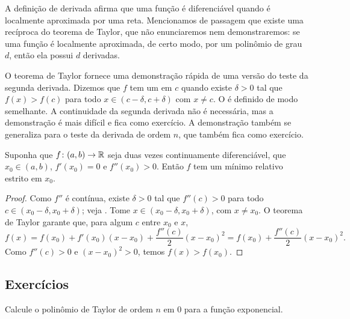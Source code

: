 \medskip

A definição de derivada afirma que uma função é diferenciável quando é localmente aproximada por uma reta. Mencionamos de passagem que existe uma recíproca do teorema de Taylor, que não enunciaremos nem demonstraremos: se uma função é localmente aproximada, de certo modo, por um polinômio de grau $d$, então ela possui $d$ derivadas.

\medskip

O teorema de Taylor fornece uma demonstração rápida de uma versão do teste da segunda derivada. Dizemos que $f$ tem um \emph{} em $c$ quando existe $\delta>0$ tal que $f(x)>f(c)$ para todo $x \in (c-\delta,c+\delta)$ com $x\neq c$. O \emph{} é definido de modo semelhante. A continuidade da segunda derivada não é necessária, mas a demonstração é mais difícil e fica como exercício. A demonstração também se generaliza para o teste da derivada de ordem $n$, que também fica como exercício.

\begin{prop}
Suponha que $f \colon (a,b) \to {\mathbb{R}}$ seja duas vezes continuamente diferenciável, que $x_0 \in (a,b)$, $f'(x_0)=0$ e $f''(x_0)>0$. Então $f$ tem um mínimo relativo estrito em $x_0$.
\end{prop}

\begin{proof}
Como $f''$ é contínua, existe $\delta>0$ tal que $f''(c)>0$ para todo $c \in (x_0-\delta,x_0+\delta)$; veja . Tome $x \in (x_0-\delta,x_0+\delta)$, com $x \neq x_0$. O teorema de Taylor garante que, para algum $c$ entre $x_0$ e $x$,
\begin{equation*}
f(x) 
=
f(x_0) + f'(x_0) (x-x_0) +
\frac{f''(c)}{2}{(x-x_0)}^{2} 
=
f(x_0) + \frac{f''(c)}{2}{(x-x_0)}^{2}  .
\end{equation*}
Como $f''(c)>0$ e ${(x-x_0)}^2>0$, temos $f(x)>f(x_0)$.
\end{proof}

\subsection{Exercícios}

\begin{exercise}
Calcule o polinômio de Taylor de ordem $n$ em $0$ para a função exponencial.
\end{exercise}

